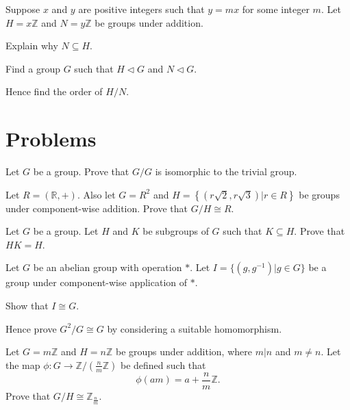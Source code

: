 \begin{exercise}
    Suppose $x$ and $y$ are positive integers such that $y = mx$ for some integer $m$. Let $H = x\mathbb{Z}$ and $N = y\mathbb{Z}$ be groups under addition.
    \begin{partquestions}{\roman*}
        \item Explain why $N \subseteq H$.
        \item Find a group $G$ such that $H \lhd G$ and $N \lhd G$.
        \item Hence find the order of $H/N$.
    \end{partquestions}
\end{exercise}

\newpage

\section{Problems}
\begin{problem}
    Let $G$ be a group. Prove that $G/G$ is isomorphic to the trivial group.
\end{problem}

\begin{problem}
    Let $R = (\mathbb{R}, +)$. Also let $G = R^2$ and $H = \left\{(r\sqrt2, r\sqrt3) \vert r\in R\right\}$ be groups under component-wise addition. Prove that $G/H \cong R$.
\end{problem}

\begin{problem}\label{problem-subgroup-product-equal-to-subgroup-if-one-is-subgroup-of-another}
    Let $G$ be a group. Let $H$ and $K$ be subgroups of $G$ such that $K \subseteq H$. Prove that $HK = H$.
\end{problem}

\begin{problem}\label{problem-cartesian-product-of-group-by-group-isomorphic-to-group}
    Let $G$ be an abelian group with operation $\ast$. Let $I = \{(g, g^{-1}) \vert g \in G\}$ be a group under component-wise application of $\ast$.
    \begin{partquestions}{\roman*}
        \item Show that $I \cong G$.
        \item Hence prove $G^2/G \cong G$ by considering a suitable homomorphism.
    \end{partquestions}
\end{problem}

\begin{problem}\label{problem-mZ/nZ-isomorphic-to-Zn/m}
    Let $G = m\mathbb{Z}$ and $H = n\mathbb{Z}$ be groups under addition, where $m\vert n$ and $m \neq n$. Let the map $\phi: G \to \mathbb{Z}/({\frac nm}\mathbb{Z})$ be defined such that
    \[
        \phi(am) = a + \frac nm \mathbb{Z}.
    \]
    Prove that $G/H \cong \mathbb{Z}_{\frac nm}$.
\end{problem}
